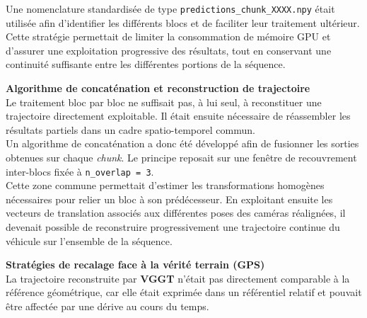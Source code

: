 \documentclass[12pt,a4paper,oneside]{report}
\begin{document}
\hspace*{.3cm}Une nomenclature standardisée de type \texttt{predictions\_chunk\_XXXX.npy} était utilisée afin d'identifier les différents blocs et de faciliter leur traitement ultérieur.\\
Cette stratégie permettait de limiter la consommation de mémoire GPU et d'assurer une exploitation progressive des résultats, tout en conservant une continuité suffisante entre les différentes portions de la séquence.

\newpage

\hspace*{0.4cm}\textbf{Algorithme de concaténation et reconstruction de trajectoire}\\

\hspace*{.3cm}Le traitement bloc par bloc ne suffisait pas, à lui seul, à reconstituer une trajectoire directement exploitable. Il était ensuite nécessaire de réassembler les résultats partiels dans un cadre spatio-temporel commun.\\
\hspace*{.3cm}Un algorithme de concaténation a donc été développé afin de fusionner les sorties obtenues sur chaque \textit{chunk}. Le principe reposait sur une fenêtre de recouvrement inter-blocs fixée à \texttt{n\_overlap = 3}.\\

\hspace*{.3cm}Cette zone commune permettait d'estimer les transformations homogènes nécessaires pour relier un bloc à son prédécesseur. En exploitant ensuite les vecteurs de translation associés aux différentes poses des caméras réalignées, il devenait possible de reconstruire progressivement une trajectoire continue du véhicule sur l'ensemble de la séquence.

\par\bigskip
\par\bigskip

\hspace*{0.4cm}\textbf{Stratégies de recalage face à la vérité terrain (GPS)}\\

\hspace*{.3cm}La trajectoire reconstruite par \textbf{VGGT} n'était pas directement comparable à la référence géométrique, car elle était exprimée dans un référentiel relatif et pouvait être affectée par une dérive au cours du temps.\\
\end{document}
